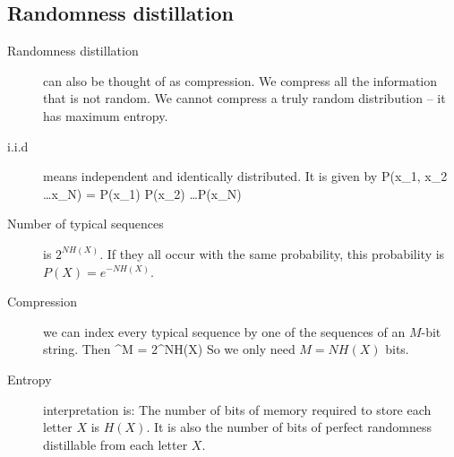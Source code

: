 \subsection{Randomness distillation}
\begin{description}
\item[Randomness distillation] can also be thought of as compression. We compress all the information that is not random. We cannot compress a truly random distribution -- it has maximum entropy. 

\item[i.i.d] means independent and identically distributed. It is given by 
\beq
P(x_1, x_2 \ldots x_N) = P(x_1) P(x_2) \ldots P(x_N)
\eeq

\item[Number of typical sequences] is $2^{N H(X)}$. If they all occur with the same probability, this probability is $P(X) = e^{- NH(X)}$. 

\item[Compression] we can index every typical sequence by one of the sequences of an $M$-bit string. Then
^M = 2^{NH(X)}
\eeq
So we only need $M = NH(X)$ bits. 

\item[Entropy] interpretation is: The number of bits of memory required to store each letter $X$ is $H(X)$. It is also the number of bits of perfect randomness distillable from each letter $X$. 

\end{description}


